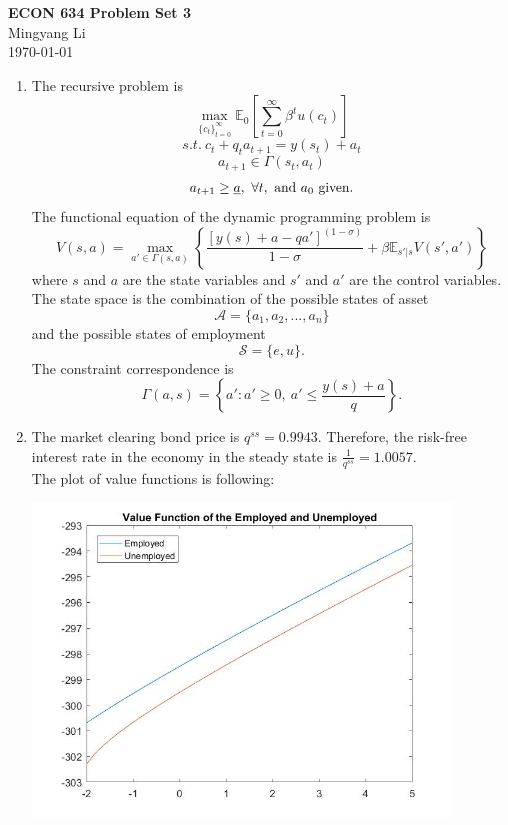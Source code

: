 \documentclass[12pt]{article}
\begin{document}
\thispagestyle{empty}
\begin{center}
\Large{\textbf{ECON 634 Problem Set 3}}\\[3mm]
\large{{Mingyang Li}}\\[1mm]
\today
\end{center}

\begin{enumerate}
\item The recursive problem is 
$$\max_{\{c_t\}_{t=0}^\infty}\mathbb{E}_0\left[\sum_{t=0}^\infty\beta^t u(c_t)\right]$$
$$s.t.\ c_t+q_ta_{t+1}=y(s_t)+a_t$$
$$a_{t+1}\in\Gamma(s_t,a_t)$$
$$a_{t+1}\geq\underbar{$a$},\ \forall t,\ \text{and}\ a_0\ \text{given.}$$
The functional equation of the dynamic programming problem is
$$V(s,a)=\max_{a'\in\Gamma(s,a)} \left\{\frac{[y(s)+a-qa']^{(1-\sigma)}}{1-\sigma}+\beta\mathbb{E}_{s'|s}V(s',a')\right\}$$
where $s$ and $a$ are the state variables and $s'$ and $a'$ are the control variables.\\
The state space is the combination of the possible states of asset $$\mathscr{A}=\{a_1,a_2,...,a_n\}$$ and the possible states of employment $$\mathscr{S}=\{e,u\}.$$
The constraint correspondence is $$\Gamma(a,s)=\left\{a':a'\geq0,\ a'\leq\frac{y(s)+a}{q}\right\}.$$
\item The market clearing bond price is $q^{ss} = 0.9943$. Therefore, the risk-free interest rate in the economy in the steady state is $\frac{1}{q^{ss}} = 1.0057$.\\The plot of value functions is following:
\begin{center}
  \includegraphics[width=111.11mm]{ValueFunction.jpg}
\end{center}


\end{enumerate}
\end{document}
